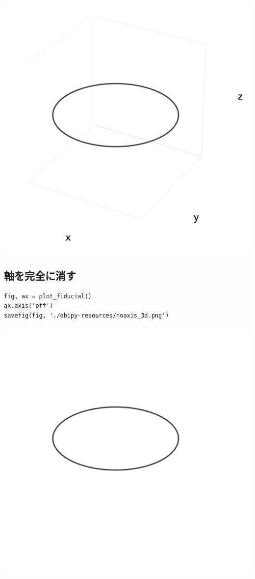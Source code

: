 \documentclass[a4paper, 10pt, notitlepage, twocolumn, uplatex, oneside, dvipdfmx]{jsarticle}
\begin{document}
\label{}
\begin{center}
\includegraphics[width=1.0\linewidth]{./obipy-resources/axis_3d.png}
\end{center}
\subsection{軸を完全に消す}
\label{sec:org01e8338}
\begin{verbatim}
fig, ax = plot_fiducial()
ax.axis('off')
savefig(fig, './obipy-resources/noaxis_3d.png')
\end{verbatim}

\label{}
\begin{center}
\includegraphics[width=1.0\linewidth]{./obipy-resources/noaxis_3d.png}
\end{center}
\end{document}
